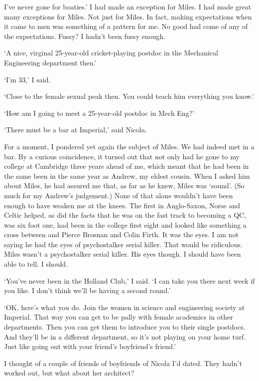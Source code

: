 I've never gone
for boaties.' I had made an exception for Miles. I had made great
many exceptions for Miles. Not just for Miles. In fact, making
expectations when it came to men was something of a pattern for me.
No good had come of any of the expectations. Fussy? I hadn't been fussy enough.

`A nice, virginal 25-year-old cricket-playing postdoc in the Mechanical Engineering department then.'

`I'm 33,' I said.

`Close to the female sexual peak then. You could teach him everything you know.'

`How am I going to meet a 25-year-old postdoc in Mech Eng?'

`There must be a bar at Imperial,' said Nicola.

For a moment, I pondered yet again the subject of Miles. We had indeed met in
a bar. By a curious coincidence, it turned out that not only had he
gone to my college at Cambridge three years ahead of me, which meant that he had been in the same been in the same year as Andrew, my eldest cousin. When I asked him about Miles, he had assured me that, as far as he knew, Miles was `sound'. (So much for my Andrew's judgement.) None of that alone wouldn't have been enough to
have weaken me at the knees. The first in Anglo-Saxon, Norse and
Celtic helped, as did the facts that he was on the fast track to
becoming a QC, was six foot one, had been in the college first eight
and looked like something a cross between and Pierce Brosnan and
Colin Firth. It was the eyes. I am not saying he had the eyes of psychostalker serial killer. That would be ridiculous. Miles wasn't a psychostalker serial killer. His eyes though. I should have been able to tell. I should.

`You've never been in the Holland Club,' I said. `I can take you there next week if you like. I don't think we'll be having a second round.'

`OK, here's what you do. Join the women in science and engineering society at Imperial. That way you can get to be pally with female academics in other departments. Then you can get them to introduce you to their single postdocs. And they'll be in a different department, so it's not playing on your home turf. Just like going out with your friend's boyfriend's friend.'

I thought of a couple of friends of boyfriends of Nicola I'd dated. They hadn't worked out, but what about her architect?

